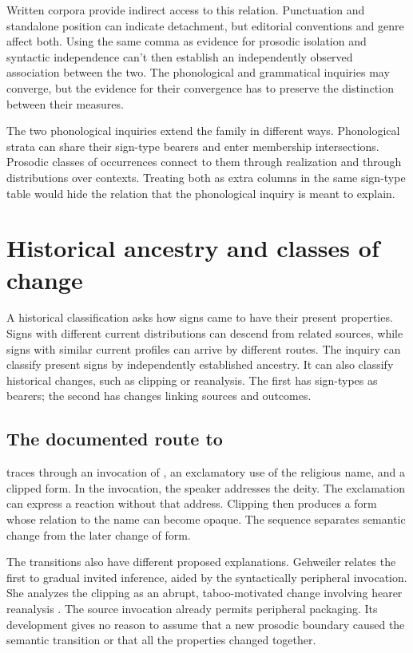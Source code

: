 \documentclass[12pt]{article}
\begin{document}
Written corpora provide indirect access to this relation. Punctuation
and standalone position can indicate detachment, but editorial conventions
and genre affect both. Using the same comma as evidence for prosodic
isolation and syntactic independence can't then establish an independently
observed association between the two. The phonological and grammatical
inquiries may converge, but the evidence for their convergence has to
preserve the distinction between their measures.

The two phonological inquiries extend the family in different ways. Phonological strata can share their sign-type bearers and
enter membership intersections. Prosodic classes of occurrences connect
to them through realization and through distributions over contexts.
Treating both as extra columns in the same sign-type table would hide
the relation that the phonological inquiry is meant to explain.

\section{Historical ancestry and classes of change}\label{sec:history}

A historical classification asks how signs came to have their present
properties. Signs with different current distributions can descend from
related sources, while signs with similar current profiles can arrive by
different routes. The inquiry can classify present signs by independently
established ancestry. It can also classify historical changes, such as
clipping or reanalysis. The first has sign-types as bearers; the second
has changes linking sources and outcomes.

\subsection{The documented route to }

\textcite{gehweiler2008} traces  through an invocation of ,
an exclamatory use of the religious name, and a clipped form. In the invocation, the speaker addresses the deity.
The exclamation can express a reaction without that address. Clipping
then produces a form whose relation to the name can become opaque.
The sequence separates semantic change from the later change of form.

The transitions also have different proposed explanations. Gehweiler
relates the first to gradual invited inference, aided by the syntactically
peripheral invocation. She analyzes the clipping as an abrupt, taboo-motivated
change involving hearer reanalysis \citep[84--88]{gehweiler2008}. The
source invocation already permits peripheral packaging. Its development
gives no reason to assume that a new prosodic boundary caused
the semantic transition or that all the properties changed together.
\end{document}
